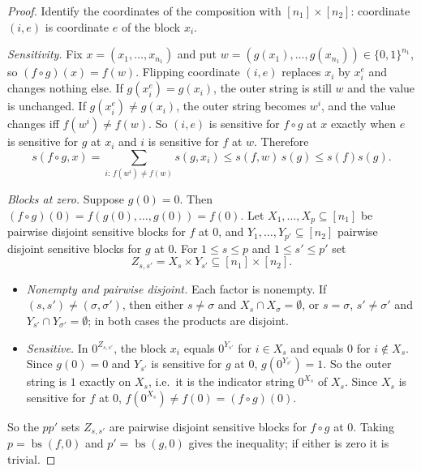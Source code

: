 \documentclass[11pt]{article}
\newcommand{\bs}{\operatorname{bs}}
\theoremstyle{definition}
\theoremstyle{remark}
\begin{document}
\begin{proof}
Identify the coordinates of the composition with \([n_1]\times[n_2]\):
coordinate \((i,e)\) is coordinate \(e\) of the block \(x_i\).

\emph{Sensitivity.} Fix \(x=(x_1,\ldots,x_{n_1})\) and put
\(w=(g(x_1),\ldots,g(x_{n_1}))\in\{0,1\}^{n_1}\), so
\((f\circ g)(x)=f(w)\). Flipping coordinate \((i,e)\) replaces \(x_i\) by
\(x_i^{e}\) and changes nothing else. If \(g(x_i^e)=g(x_i)\), the outer
string is still \(w\) and the value is unchanged. If
\(g(x_i^e)\ne g(x_i)\), the outer string becomes \(w^{i}\), and the value
changes iff \(f(w^{i})\ne f(w)\). So \((i,e)\) is sensitive for \(f\circ g\)
at \(x\) exactly when \(e\) is sensitive for \(g\) at \(x_i\) and \(i\) is
sensitive for \(f\) at \(w\). Therefore
\[
 s(f\circ g,x)
   =\sum_{i:\,f(w^{i})\ne f(w)}s(g,x_i)
   \leq s(f,w)\,s(g)
   \leq s(f)s(g).
\]

\emph{Blocks at zero.} Suppose \(g(0)=0\). Then
\((f\circ g)(0)=f(g(0),\ldots,g(0))=f(0)\). Let
\(X_1,\ldots,X_p\subseteq[n_1]\) be pairwise disjoint sensitive blocks for
\(f\) at \(0\), and \(Y_1,\ldots,Y_{p'}\subseteq[n_2]\) pairwise disjoint
sensitive blocks for \(g\) at \(0\). For \(1\leq s\leq p\) and
\(1\leq s'\leq p'\) set
\[
 Z_{s,s'}=X_s\times Y_{s'}\subseteq[n_1]\times[n_2].
\]
\begin{itemize}[nosep]
\item \emph{Nonempty and pairwise disjoint.} Each factor is nonempty. If
 \((s,s')\ne(\sigma,\sigma')\), then either \(s\ne\sigma\) and
 \(X_s\cap X_\sigma=\emptyset\), or \(s=\sigma\), \(s'\ne\sigma'\) and
 \(Y_{s'}\cap Y_{\sigma'}=\emptyset\); in both cases the products are
 disjoint.
\item \emph{Sensitive.} In \(0^{Z_{s,s'}}\), the block \(x_i\) equals
 \(0^{Y_{s'}}\) for \(i\in X_s\) and equals \(0\) for \(i\notin X_s\). Since
 \(g(0)=0\) and \(Y_{s'}\) is sensitive for \(g\) at \(0\),
 \(g(0^{Y_{s'}})=1\). So the outer string is \(1\) exactly on \(X_s\), i.e.\
 it is the indicator string \(0^{X_s}\) of \(X_s\). Since \(X_s\) is
 sensitive for \(f\) at \(0\), \(f(0^{X_s})\ne f(0)=(f\circ g)(0)\).
\end{itemize}
So the \(pp'\) sets \(Z_{s,s'}\) are pairwise disjoint sensitive blocks for
\(f\circ g\) at \(0\). Taking \(p=\bs(f,0)\) and \(p'=\bs(g,0)\) gives the
inequality; if either is zero it is trivial.
\end{proof}
\end{document}
